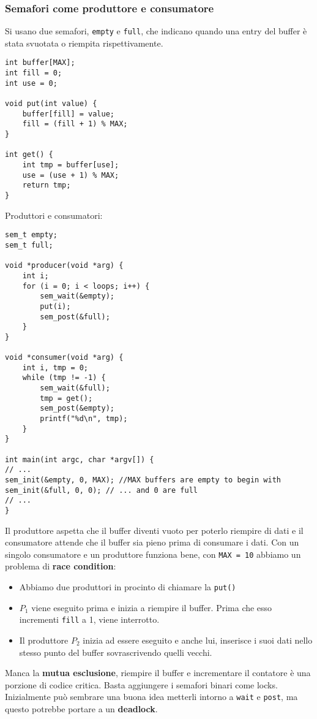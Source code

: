 \documentclass[12pt, letterpaper]{article}
\begin{document}
			\subsubsection{Semafori come produttore e consumatore}
				Si usano due semafori, \texttt{empty} e \texttt{full}, che indicano quando una entry del buffer è stata svuotata o riempita rispettivamente.
				\begin{lstlisting}[style=CStyle]
int buffer[MAX];
int fill = 0;
int use = 0;

void put(int value) {
	buffer[fill] = value;
	fill = (fill + 1) % MAX; 
}

int get() {
	int tmp = buffer[use];
	use = (use + 1) % MAX;
	return tmp;
}				\end{lstlisting}
				Produttori e consumatori: 
				\begin{lstlisting}[style=CStyle]
sem_t empty;
sem_t full;

void *producer(void *arg) {
	int i;
	for (i = 0; i < loops; i++) {
		sem_wait(&empty);
		put(i);
		sem_post(&full);
	}
}

void *consumer(void *arg) {
	int i, tmp = 0;
	while (tmp != -1) {
		sem_wait(&full);
		tmp = get();
		sem_post(&empty);
		printf("%d\n", tmp);
	}
}

int main(int argc, char *argv[]) {
// ...
sem_init(&empty, 0, MAX); //MAX buffers are empty to begin with
sem_init(&full, 0, 0); // ... and 0 are full
// ...
}				\end{lstlisting}
				Il produttore aspetta che il buffer diventi vuoto per poterlo riempire di dati e il consumatore attende che il buffer sia pieno prima di consumare i dati. Con un singolo consumatore e un produttore funziona bene, con \texttt{MAX = 10} abbiamo un problema di \textbf{race condition}:
				\begin{itemize}
					\item Abbiamo due produttori in procinto di chiamare la \texttt{put()}
					\item $P_1$ viene eseguito prima e inizia a riempire il buffer. Prima che esso incrementi \texttt{fill} a 1, viene interrotto. 
					\item Il produttore $P_2$ inizia ad essere eseguito e anche lui, inserisce i suoi dati nello stesso punto del buffer sovrascrivendo quelli vecchi. 
				\end{itemize}
				Manca la \textbf{mutua esclusione}, riempire il buffer e incrementare il contatore è una porzione di codice critica. Basta aggiungere i semafori binari come locks. Inizialmente può sembrare una buona idea metterli intorno a \texttt{wait} e \texttt{post}, ma questo potrebbe portare a un \textbf{deadlock}. 
\end{document}
